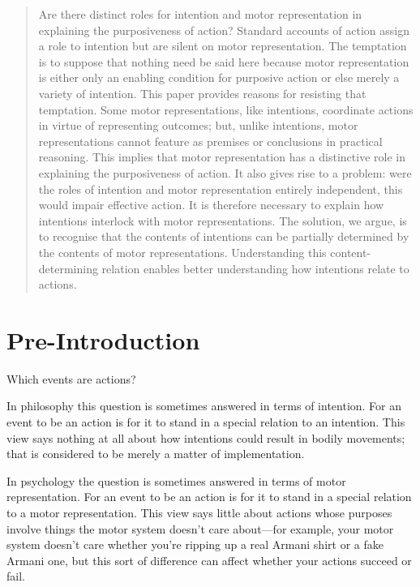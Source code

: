 \documentclass[12pt,\papersize]{extarticle}
\begin{document}
\setlength\footnotesep{1em}


\maketitle
\title{}

\begin{abstract}
\noindent
Are there distinct roles for intention and motor representation in explaining the purposiveness of action? Standard accounts of action assign a role to intention but are silent on motor representation. The temptation is to suppose that nothing need be said here because motor representation is either only an enabling condition for purposive action or else merely a variety of intention. This paper provides reasons for resisting that temptation. Some motor representations, like intentions, coordinate actions in virtue of representing outcomes; but, unlike intentions, motor representations cannot feature as premises or conclusions in practical reasoning.  This implies that motor representation has a distinctive role in explaining the purposiveness of action. It also gives rise to a problem: were the roles of intention and motor representation entirely independent, this would impair effective action. It is therefore necessary to explain how intentions interlock with motor representations. The solution, we argue, is to recognise that the contents of intentions can be partially determined by the contents of motor representations. Understanding this content-determining relation enables better understanding how intentions relate to actions.


\end{abstract}


\section{Pre-Introduction}

Which events are actions?

In philosophy this question is sometimes answered in terms of intention.
For an event to be an action is for it to stand in a special relation to an intention.
This view says nothing at all about how intentions could result in bodily movements; that is considered to be merely a matter of implementation.

In psychology the question is sometimes answered in terms of motor representation.
For an event to be an action is for it to stand in a special relation to a motor representation.
This view says little about actions whose purposes involve things the motor system doesn’t care about---for example, your motor system doesn’t care whether you’re ripping up a real Armani shirt or a fake Armani one, but this sort of difference can affect whether your actions succeed or fail.
\end{document}
